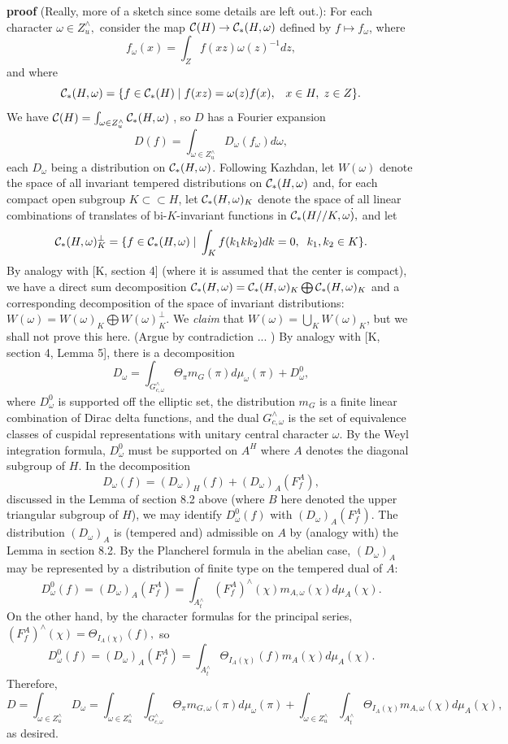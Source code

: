 {\bf proof} (Really, more of a sketch since some details are left out.): For
each character $\omega \in Z_u^{\wedge },$ consider the map ${\cal C}%
(H)\rightarrow {\cal C}_{*}(H,\omega )$ defined by $f\longmapsto f_\omega $,
where 
\[
f_\omega (x)=\int_Zf(xz)\omega (z)^{-1}dz, 
\]
and where 
\[
{\cal C}_{*}(H,\omega )=\{f\in {\cal C}_{*}(H)\;|\;f(xz)=\omega
(z)f(x),\;\;\;x\in H,\;z\in Z\}. 
\]
We have ${\cal C}(H)=\int_{\omega \in Z_u^{\wedge }}{\cal C}_{*}(H,\omega )$%
, so $D$ has a Fourier expansion 
\[
D(f)=\int_{\omega \in Z_u^{\wedge }}D_\omega (f_\omega )d\omega , 
\]
each $D_\omega $ being a distribution on ${\cal C}_{*}(H,\omega )$.
Following Kazhdan, let $W(\omega )$ denote the space of all invariant
tempered distributions on ${\cal C}_{*}(H,\omega )$ and, for each compact
open subgroup $K\subset \subset H$, let ${\cal C}_{*}(H,\omega )_K$ denote
the space of all linear combinations of translates of bi-$K$-invariant
functions in ${\cal C}_{*}(H//K,\omega \dot ),$ and let 
\[
{\cal C}_{*}(H,\omega )_K^{\perp }=\{f\in {\cal C}_{*}(H,\omega
)\;|\;\int_Kf(k_1kk_2)dk=0,\;\;k_1,k_2\in K\}. 
\]
By analogy with [K, section 4] (where it is assumed that the center is
compact), we have a direct sum decomposition ${\cal C}_{*}(H,\omega )={\cal C%
}_{*}(H,\omega )_K\bigoplus {\cal C}_{*}(H,\omega )_K$ and a corresponding
decomposition of the space of invariant distributions: $W(\omega )=W(\omega
)_K\bigoplus W(\omega )_K^{\perp }.$ We {\em claim} that $W(\omega
)=\bigcup_KW(\omega )_K$, but we shall not prove this here. (Argue by
contradiction ... ) By analogy with [K, section 4, Lemma 5], there is a
decomposition 
\[
D_\omega =\int_{G_{c,\omega }^{\wedge }}\Theta _\pi m_G(\pi )d\mu _\omega
(\pi )+D_\omega ^0, 
\]
where $D_\omega ^0$ is supported off the elliptic set, the distribution $m_G$
is a finite linear combination of Dirac delta functions, and the dual $%
G_{c,\omega }^{\wedge }$ is the set of equivalence classes of cuspidal
representations with unitary central character $\omega $. By the Weyl
integration formula, $D_\omega ^0$ must be supported on $A^H$ where $A$
denotes the diagonal subgroup of $H$. In the decomposition 
\[
D_\omega (f)=(D_\omega )_H(f)+(D_\omega )_A(F_f^A), 
\]
discussed in the Lemma of section 8.2 above (where $B$ here denoted the
upper triangular subgroup of $H$), we may identify $D_\omega ^0(f)$ with $%
(D_\omega )_A(F_f^A).$ The distribution $(D_\omega )_A$ is (tempered and)
admissible on $A$ by (analogy with) the Lemma in section 8.2. By the
Plancherel formula in the abelian case, $(D_\omega )_A$ may be represented
by a distribution of finite type on the tempered dual of $A$: 
\[
D_\omega ^0(f)=(D_\omega )_A(F_f^A)=\int_{A_t^{\wedge }}(F_f^A)^{\wedge
}(\chi )m_{A,\omega }(\chi )d\mu _A(\chi ). 
\]
On the other hand, by the character formulas for the principal series, $%
(F_f^A)^{\wedge }(\chi )=\Theta _{I_A(\chi )}(f),$ so 
\[
D_\omega ^0(f)=(D_\omega )_A(F_f^A)=\int_{A_t^{\wedge }}\Theta _{I_A(\chi
)}(f)m_A(\chi )d\mu _A(\chi ). 
\]
Therefore, 
\[
D=\int_{\omega \in Z_u^{\wedge }}D_\omega =\int_{\omega \in Z_u^{\wedge
}}\int_{G_{c,\omega }^{\wedge }}\Theta _\pi m_{G,\omega }(\pi )d\mu _\omega
(\pi )+\int_{\omega \in Z_u^{\wedge }}\int_{A_t^{\wedge }}\Theta _{I_A(\chi
)}m_{A,\omega }(\chi )d\mu _A(\chi ), 
\]
as desired.


